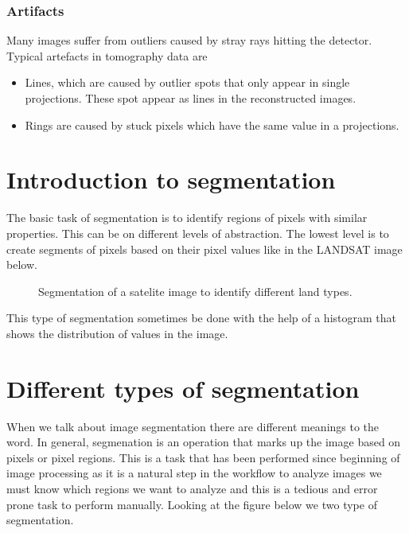\documentclass[letterpaper,10pt,english]{sphinxmanual}
\begin{document}
\subsubsection{Artifacts}
\label{\detokenize{ML4NeutronImageSegmentation:artifacts}}
Many images suffer from outliers caused by stray rays hitting the detector. Typical artefacts in tomography data are
\begin{itemize}
\item {} 
Lines, which are caused by outlier spots that only appear in single projections. These spot appear as lines in the reconstructed images.

\item {} 
Rings are caused by stuck pixels which have the same value in a projections.

\end{itemize}


\section{Introduction to segmentation}
\label{\detokenize{ML4NeutronImageSegmentation:introduction-to-segmentation}}
The basic task of segmentation is to identify regions of pixels with similar properties. This can be on different levels of abstraction. The lowest level is to create segments of pixels based on their pixel values like in the LANDSAT image below.

\begin{figure}[htbp]
\centering
\capstart

\noindent{}
\caption{Segmentation of a satelite image to identify different land types.}\label{\detokenize{ML4NeutronImageSegmentation:id9}}\end{figure}

This type of segmentation sometimes be done with the help of a histogram that shows the distribution of values in the image.




\section{Different types of segmentation}
\label{\detokenize{ML4NeutronImageSegmentation:different-types-of-segmentation}}
When we talk about image segmentation there are different meanings to the word. In general, segmenation is an operation that marks up the image based on pixels or pixel regions. This is a task that has been performed since beginning of image processing as it is a natural step in the workflow to analyze images \sphinxhyphen{} we must know which regions we want to analyze and this is a tedious and error prone task to perform manually. Looking at the figure below we two type of segmentation.
\end{document}
